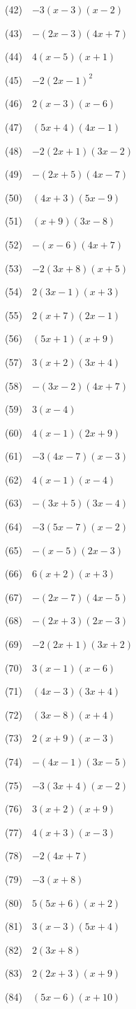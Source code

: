 \documentclass[a4j,twocolumn,10pt,fleqn]{jarticle}
\begin{document}
(42)~~$-3(x-3)(x-2)$

(43)~~$-(2x-3)(4x+7)$

(44)~~$4(x-5)(x+1)$

(45)~~$-2(2x-1)^2$

(46)~~$2(x-3)(x-6)$

(47)~~$(5x+4)(4x-1)$

(48)~~$-2(2x+1)(3x-2)$

(49)~~$-(2x+5)(4x-7)$

(50)~~$(4x+3)(5x-9)$

(51)~~$(x+9)(3x-8)$

(52)~~$-(x-6)(4x+7)$

(53)~~$-2(3x+8)(x+5)$

(54)~~$2(3x-1)(x+3)$

(55)~~$2(x+7)(2x-1)$

(56)~~$(5x+1)(x+9)$

(57)~~$3(x+2)(3x+4)$

(58)~~$-(3x-2)(4x+7)$

(59)~~$3(x-4)$

(60)~~$4(x-1)(2x+9)$

(61)~~$-3(4x-7)(x-3)$

(62)~~$4(x-1)(x-4)$

(63)~~$-(3x+5)(3x-4)$

(64)~~$-3(5x-7)(x-2)$

(65)~~$-(x-5)(2x-3)$

(66)~~$6(x+2)(x+3)$

(67)~~$-(2x-7)(4x-5)$

(68)~~$-(2x+3)(2x-3)$

(69)~~$-2(2x+1)(3x+2)$

(70)~~$3(x-1)(x-6)$

(71)~~$(4x-3)(3x+4)$

(72)~~$(3x-8)(x+4)$

(73)~~$2(x+9)(x-3)$

(74)~~$-(4x-1)(3x-5)$

(75)~~$-3(3x+4)(x-2)$

(76)~~$3(x+2)(x+9)$

(77)~~$4(x+3)(x-3)$

(78)~~$-2(4x+7)$

(79)~~$-3(x+8)$

(80)~~$5(5x+6)(x+2)$

(81)~~$3(x-3)(5x+4)$

(82)~~$2(3x+8)$

(83)~~$2(2x+3)(x+9)$

(84)~~$(5x-6)(x+10)$
\end{document}
